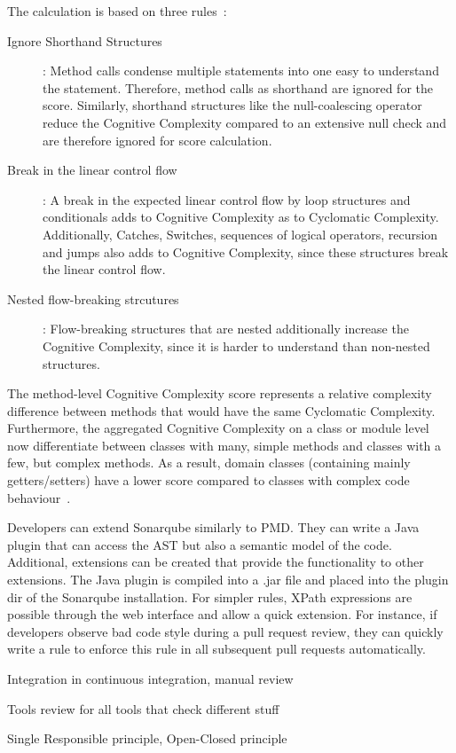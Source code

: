 The calculation is based on three rules~\cite{campbell2018cognitive}:
\begin{description}
    \item[Ignore Shorthand Structures]: Method calls condense multiple statements into one easy to understand the statement. Therefore, method calls as shorthand are ignored for the score. Similarly, shorthand structures like the null-coalescing operator reduce the Cognitive Complexity compared to an extensive null check and are therefore ignored for score calculation.
    \item[Break in the linear control flow]: A break in the expected linear control flow by loop structures and conditionals adds to Cognitive Complexity as to Cyclomatic Complexity. Additionally, Catches, Switches, sequences of logical operators, recursion and jumps also adds to Cognitive Complexity, since these structures break the linear control flow.
    \item[Nested flow-breaking strcutures]: Flow-breaking structures that are nested additionally increase the Cognitive Complexity, since it is harder to understand than non-nested structures.  
\end{description}
The method-level Cognitive Complexity score represents a relative complexity difference between methods that would have the same Cyclomatic Complexity. Furthermore, the aggregated Cognitive Complexity on a class or module level now differentiate between classes with many, simple methods and classes with a few, but complex methods. As a result, domain classes (containing mainly getters/setters) have a lower score compared to classes with complex code behaviour~\cite{campbell2018cognitive}.

Developers can extend Sonarqube similarly to PMD. They can write a Java plugin that can access the AST but also a semantic model of the code. Additional, extensions can be created that provide the functionality to other extensions. The Java plugin is compiled into a .jar file and placed into the plugin dir of the Sonarqube installation. For simpler rules, XPath expressions are possible through the web interface and allow a quick extension. For instance, if developers observe bad code style during a pull request review, they can quickly write a rule to enforce this rule in all subsequent pull requests automatically.

Integration in continuous integration, manual review

Tools review for all tools that check different stuff

Single Responsible principle, Open-Closed principle

